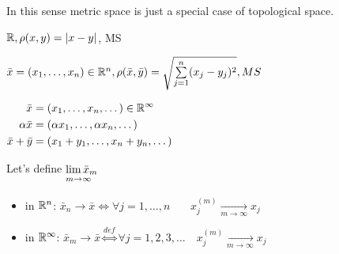 In this sense metric space is just a special case of topological space.
\begin{ex}
  $\mathbb{R}, \rho(x, y) = |x - y|$, MS
\end{ex}
\begin{ex}
  $\bar{x} = (x_1, \dotsc, x_n) \in \mathbb{R}^n, \rho(\bar{x}, \bar{y}) = \sqrt{\sum\limits_{j = 1}^n(x_j - y_j)^2}, MS$
\end{ex}
\begin{ex}
    \hspace{-1.9em}$\begin{aligned}[t]
      \bar{x} &= (x_1, \dotsc, x_n, \dotso) \in \mathbb{R}^\infty \\
      \alpha\bar{x} &= (\alpha x_1, \dotsc, \alpha x_n, \dotsc) \\
      \bar{x} + \bar{y} &= (x_1 + y_1, \dotsc, x_n + y_n, \dotsc)
  \end{aligned}$

      Let's define $\alim{\bar{x}_m}{m \to \infty}$
      \begin{itemize}
          \item{in $\mathbb{R}^n$:}
              $\bar{x}_n \to \bar{x} \iff \forall j = 1, \dotsc, n\quad\ \ \:\,x_j^{(m)} \xrightarrow[m \to \infty]{} x_j$
          \item{in $\mathbb{R}^\infty$:}
              $\bar{x}_m \to \bar{x} \overset{def}{\iff} \forall j = 1,2,3,\dotso \quad x_j^{(m)} \xrightarrow[m \to \infty]{} x_j$
      \end{itemize}
\end{ex}
